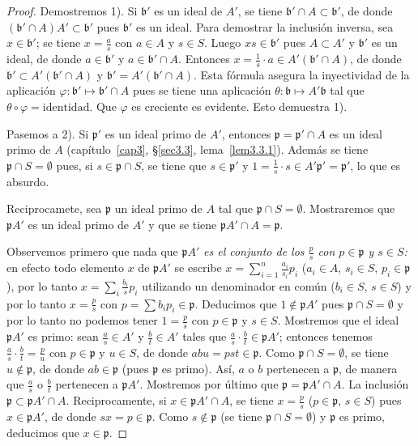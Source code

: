 \documentclass[oneside,bibtotoc,leqno,spanish]{amsbook}
\newcommand{\idl}[1]{\mathfrak{#1}}
\numberwithin{equation}{section}
\theoremstyle{defi}
\theoremstyle{note}
\theoremstyle{rem}
\numberwithin{theorem}{section}
\numberwithin{proposition}{section}
\numberwithin{definition}{section}
\numberwithin{lemma}{section}
\numberwithin{corollary}{section}
\numberwithin{example}{section}
\numberwithin{footnote}{section}%
\begin{document}
\begin{proof}
Demostremos 1). Si $\idl{b}'$ es un ideal de $A'$, se tiene $\idl{b}'\cap A\subset\idl{b}'$, de donde
$(\idl{b}'\cap A)A'\subset\idl{b}'$ pues $\idl{b}'$ es un ideal. Para demostrar la inclusi\'on inversa, sea
$x\in\idl{b}'$; se tiene $x = \frac{a}{s}$ con $a\in A$ y $s\in S$. Luego $xs\in\idl{b}'$ pues
$A\subset A'$ y $\idl{b}'$ es un ideal, de donde $a\in\idl{b}'$ y $a\in\idl{b}'\cap A$. Entonces
$x=\frac{1}{s}\cdot a\in A'(\idl{b}'\cap A)$, de donde $\idl{b}'\subset A'(\idl{b}'\cap A)$ y
$\idl{b}'=A'(\idl{b}'\cap A)$. Esta f\'ormula asegura la inyectividad de la aplicaci\'on
$\varphi:\idl{b}'\mapsto\idl{b}'\cap A$ pues se tiene una aplicaci\'on $\theta:\idl{b}\mapsto A'\idl{b}$
tal que $\theta\circ\varphi = \text{identidad}$. Que $\varphi$ es creciente es evidente. Esto demuestra 1).

Pasemos a 2). Si $\idl{p}'$ es un ideal primo de $A'$, entonces $\idl{p} = \idl{p}'\cap A$ es un ideal primo de $A$
(cap\'itulo~\ref{cap3}, \S\ref{sec3.3}, lema~\ref{lem3.3.1}).
Adem\'as se tiene $\idl{p}\cap S=\emptyset$ pues, si
$s\in\idl{p}\cap S$, se tiene que $s\in\idl{p}'$ y $1=\frac{1}{s}\cdot s\in A'\idl{p}'=\idl{p}'$, lo que
es absurdo.

Reciprocamete, sea $\idl{p}$ un ideal primo de $A$ tal que $\idl{p}\cap S=\emptyset$. Mostraremos que
$\idl{p}A'$ es un ideal primo de $A'$ y que se tiene $\idl{p}A'\cap A = \idl{p}$.

Observemos primero que nada que $\idl{p}A'$ {\em es el conjunto de los $\frac{p}{s}$ con
$p\in\idl{p}$ y $s\in S$:} en efecto todo elemento $x$ de $\idl{p}A'$ se escribe
$x=\sum_{i=1}^{n}\frac{a_{i}}{s_{i}}p_{i}$
($a_{i}\in A$, $s_{i}\in S$, $p_{i}\in\idl{p}$), por lo tanto $x=\sum_{i}\frac{b_{i}}{s}p_{i}$ utilizando
un denominador en com\'un ($b_{i}\in S$, $s\in S$) y por lo tanto $x = \frac{p}{s}$ con $p=\sum b_{i}p_{i}\in\idl{p}$.
Deducimos que $1\notin\idl{p}A'$ pues $\idl{p}\cap S=\emptyset$ y por lo tanto no podemos tener
$1=\frac{p}{s}$ con $p\in\idl{p}$ y $s\in S$. Mostremos que el ideal $\idl{p}A'$ es primo:
sean $\frac{a}{s}\in A'$ y $\frac{b}{t}\in A'$ tales que $\frac{a}{s}\cdot\frac{b}{t}\in\idl{p}A'$; entonces
tenemos $\frac{a}{s}\cdot\frac{b}{t} = \frac{p}{u}$ con $p\in\idl{p}$ y $u\in S$, de donde
$abu = pst\in\idl{p}$. Como $\idl{p}\cap S=\emptyset$, se tiene $u\notin\idl{p}$, de donde $ab\in\idl{p}$
(pues $\idl{p}$ es primo). As\'i, $a$ o $b$ pertenecen a $\idl{p}$, de manera que
$\frac{a}{s}$ o $\frac{b}{t}$ pertenecen a $\idl{p}A'$. Mostremos por \'ultimo que $\idl{p}=\idl{p}A'\cap A$.
La inclusi\'on $\idl{p}\subset\idl{p}A'\cap A$. Reciprocamente, si $x\in\idl{p}A'\cap A$, se tiene
$x = \frac{p}{s}$ ($p\in\idl{p}$, $s\in S$) pues $x\in\idl{p}A'$, de donde $sx = p\in\idl{p}$. Como
$s\notin\idl{p}$ (se tiene $\idl{p}\cap S = \emptyset$) y $\idl{p}$ es primo, deducimos que $x\in\idl{p}$.


\end{proof}
\end{document}
